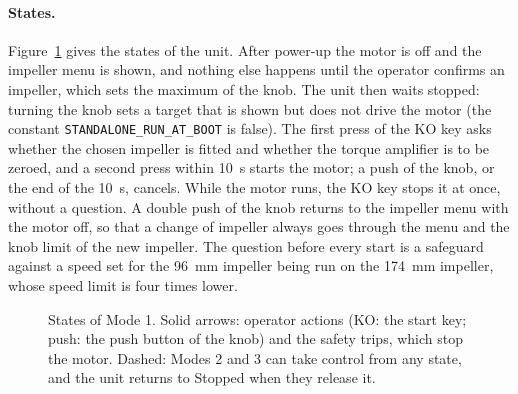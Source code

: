 \paragraph{States.}
Figure~\ref{fig:mode1-states} gives the states of the unit. After power-up the motor is off and the impeller menu is shown, and nothing else happens until the operator confirms an impeller, which sets the maximum of the knob. The unit then waits stopped: turning the knob sets a target that is shown but does not drive the motor (the constant \texttt{STANDALONE\_RUN\_AT\_BOOT} is false). The first press of the KO key asks whether the chosen impeller is fitted and whether the torque amplifier is to be zeroed, and a second press within 10~s starts the motor; a push of the knob, or the end of the 10~s, cancels. While the motor runs, the KO key stops it at once, without a question. A double push of the knob returns to the impeller menu with the motor off, so that a change of impeller always goes through the menu and the knob limit of the new impeller. The question before every start is a safeguard against a speed set for the 96~mm impeller being run on the 174~mm impeller, whose speed limit is four times lower.

\begin{figure}[htbp]
    \centering
    \caption[States of the standalone interface]{States of Mode 1. Solid arrows: operator actions (KO: the start key; push: the push button of the knob) and the safety trips, which stop the motor. Dashed: Modes 2 and 3 can take control from any state, and the unit returns to Stopped when they release it.}
    \label{fig:mode1-states}
\end{figure}

